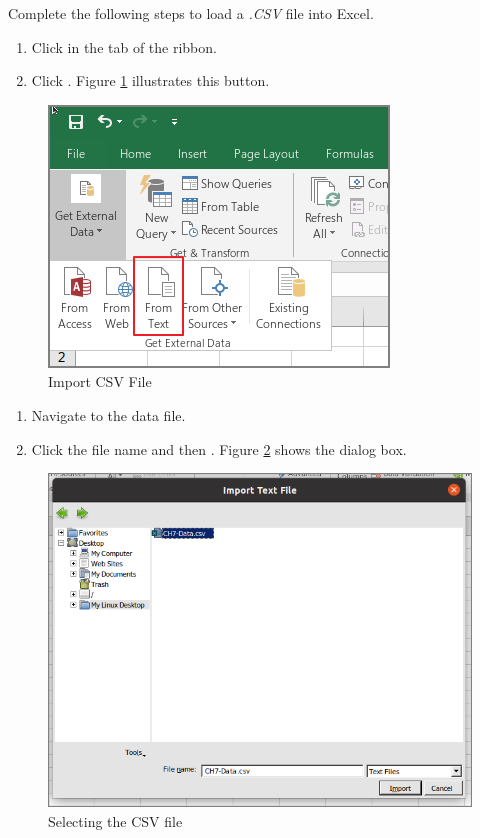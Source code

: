 Complete the following steps to load a \textit{.CSV} file into Excel.

\begin{enumerate}
	\item Click  in the  tab of the ribbon.
	\item Click . Figure \ref{07:fig05} illustrates this button.
\end{enumerate}

\begin{figure}[H]
	\centering
	\includegraphics[width=\maxwidth{.95\linewidth}]{gfx/ch07_fig05}
	\caption{Import CSV File}
	\label{07:fig05}
\end{figure}

\begin{enumerate}
	\item Navigate to the data file.
	\item Click the file name and then . Figure \ref{07:fig06} shows the  dialog box.
\end{enumerate}

\begin{figure}[H]
	\centering
	\includegraphics[width=\maxwidth{.95\linewidth}]{gfx/ch07_fig06}
	\caption{Selecting the CSV file}
	\label{07:fig06}
\end{figure}

